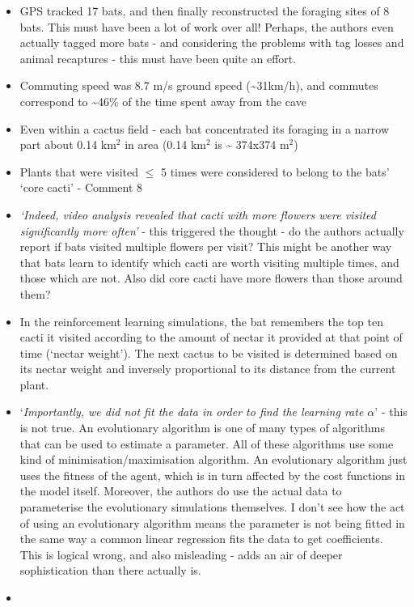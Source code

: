 \documentclass[
]{book}
\begin{document}
\begin{itemize}
\item
  GPS tracked 17 bats, and then finally reconstructed the foraging sites of 8 bats. This must have been a lot of work over all! Perhaps, the authors even actually tagged more bats - and considering the problems with tag losses and animal recaptures - this must have been quite an effort.
\item
  Commuting speed was 8.7 m/s ground speed (\textasciitilde31km/h), and commutes correspond to \textasciitilde46\% of the time spent away from the cave
\item
  Even within a cactus field - each bat concentrated its foraging in a narrow part about 0.14 km\(^{2}\) in area (0.14 km\(^{2}\) is \textasciitilde{} 374x374 m\(^{2}\))
\item
  Plants that were visited \(\leq\) 5 times were considered to belong to the bats' `core cacti' - Comment 8
\item
  \emph{`Indeed, video analysis revealed that cacti with more flowers were visited significantly more often'} - this triggered the thought - do the authors actually report if bats visited multiple flowers per visit? This might be another way that bats learn to identify which cacti are worth visiting multiple times, and those which are not. Also did core cacti have more flowers than those around them?
\item
  In the reinforcement learning simulations, the bat remembers the top ten cacti it visited according to the amount of nectar it provided at that point of time (`nectar weight'). The next cactus to be visited is determined based on its nectar weight and inversely proportional to its distance from the current plant.
\item
  `\emph{Importantly, we did not fit the data in order to find the learning rate \(\alpha\)}' - this is not true. An evolutionary algorithm is one of many types of algorithms that can be used to estimate a parameter. All of these algorithms use some kind of minimisation/maximisation algorithm. An evolutionary algorithm just uses the fitness of the agent, which is in turn affected by the cost functions in the model itself. Moreover, the authors do use the actual data to parameterise the evolutionary simulations themselves. I don't see how the act of using an evolutionary algorithm means the parameter is not being fitted in the same way a common linear regression fits the data to get coefficients. This is logical wrong, and also misleading - adds an air of deeper sophistication than there actually is.
\item

\end{itemize}
\end{document}

